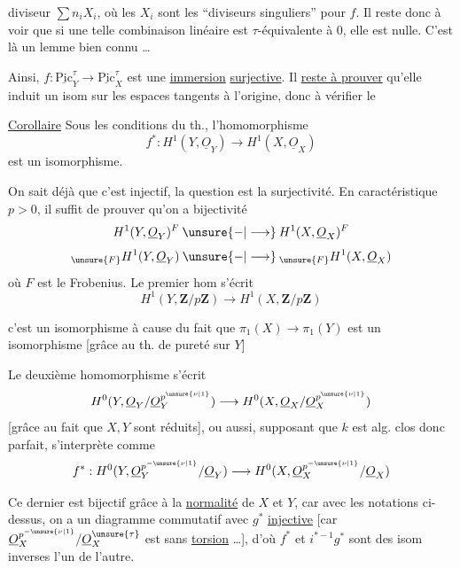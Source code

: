 
diviseur $\sum n_iX_i$, où les $X_i$ sont les ``diviseurs singuliers''
pour $f$. Il reste donc à voir que si une telle combinaison linéaire est
$\tau$-équivalente à $0$, elle est nulle.
C'est là un lemme bien connu \ldots


Ainsi, $f:\underline{\mathrm{Pic}}_Y^\tau\longrightarrow
\underline{\mathrm{Pic}}_X^\tau$ est une \uline{immersion}
\uline{surjective}.
Il \uline{reste à prouver} qu'elle induit un isom sur les espaces tangents
à l'origine, donc à vérifier le

\uline{Corollaire} Sous les conditions du th., l'homomorphisme
\[
f^*:H^1(Y,\underline O_Y)\longrightarrow H^1(X,\underline O_X)
\]
est un isomorphisme.

On sait déjà que c'est injectif, la question est la surjectivité.
En caractéristique $p>0$, il suffit de prouver qu'on a bijectivité
\[
H^1(Y,\underline O_Y)^F
\mathbin{\unsure{-|\longrightarrow}}
H^1(X,\underline O_X)^F
\]
\[
{}_{\unsure{F}}H^1(Y,\underline O_Y)
\mathbin{\unsure{-|\longrightarrow}}
{}_{\unsure{F}}H^1(X,\underline O_X)
\]
où $F$ est le Frobenius.
Le premier hom s'écrit
\[
H^1(Y,\mathbf Z/p\mathbf Z)\longrightarrow H^1(X,\mathbf Z/p\mathbf Z)
\]

c'est un isomorphisme à cause du fait que
$\pi_1(X)\to\pi_1(Y)$ est un isomorphisme
[grâce au th. de pureté sur $Y$]

Le deuxième homomorphisme s'écrit
\[
H^0(Y,\underline O_Y/\underline O_Y^{p^{\unsure{\nu|1}}})
\longrightarrow
H^0(X,\underline O_X/\underline O_X^{p^{\unsure{\nu|1}}})
\]
[grâce au fait que $X,Y$ sont réduits],
ou aussi, supposant que $k$ est alg. clos donc parfait,
s'interprète comme
\[
f^*:H^0(Y,\underline O_Y^{p^{-\unsure{\nu|1}}}/\underline O_Y)
\longrightarrow
H^0(X,\underline O_X^{p^{-\unsure{\nu|1}}}/\underline O_X)
\]

Ce dernier est bijectif grâce à la \uline{normalité} de $X$ et $Y$,
car  avec les notations ci-dessus, on a un
diagramme commutatif
avec $g^*$ \uline{injective}
[car $\underline O_X^{p^{-\unsure{\nu|1}}}/
\underline O_X^{\unsure{\tau}}$ est 
sans \uline{torsion} \ldots],
d'où $f^*$ et $i^{*-1}g^*$ sont des isom inverses l'un de l'autre.

